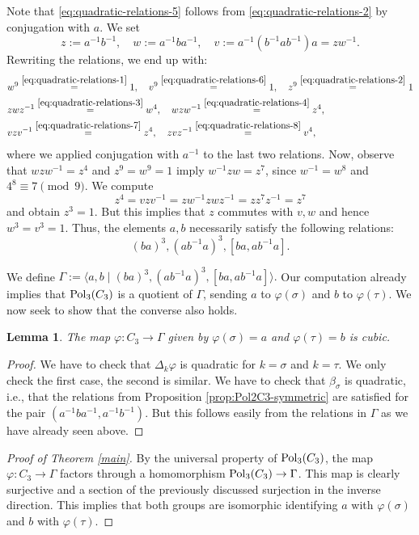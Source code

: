\documentclass[11pt, a4paper]{amsproc}
\newtheorem{lemma}[lem]{Lemma}
\theoremstyle{remark}
\theoremstyle{plain}
\begin{document}
Note that \eqref{eq:quadratic-relations-5} follows from \eqref{eq:quadratic-relations-2} by conjugation with $a$. We set
\[
z := a^{-1}b^{-1},\quad w := a^{-1}ba^{-1},\quad v := a^{-1}(b^{-1}ab^{-1})a = z w^{-1}.
\]
Rewriting the relations, we end up with:
\begin{align*}
&w^9\stackrel{\eqref{eq:quadratic-relations-1}}{=}1, \quad v^9\stackrel{\eqref{eq:quadratic-relations-6}}{=}1, \quad z^9\stackrel{\eqref{eq:quadratic-relations-2}}{=}1\\
 &z w z^{-1}\stackrel{\eqref{eq:quadratic-relations-3}}{=}w^4,\quad w z w^{-1}\stackrel{\eqref{eq:quadratic-relations-4}}{=}z^4,\\
&vz v^{-1}\stackrel{\eqref{eq:quadratic-relations-7}}{=}z^4, \quad  z v z^{-1}\stackrel{\eqref{eq:quadratic-relations-8}}{=} v^4,
\end{align*}
where we applied conjugation with $a^{-1}$ to the last two relations. Now, observe that $wzw^{-1}=z^4$ and $z^9=w^9=1$ imply $w^{-1}z w = z^7$, since $w^{-1}=w^8$ and $4^8 \equiv 7 \pmod{9}$.
We compute
$$z^4=vzv^{-1} = zw^{-1}zwz^{-1} = z z^7 z^{-1} = z^7$$
and obtain $z^3=1$. But this implies that $z$ commutes with $v,w$ and hence $w^3=v^3=1$. Thus, the elements $a,b$ necessarily satisfy the following relations:
$$(ba)^3, (ab^{-1}a)^3, [ba,ab^{-1}a].$$

We define $\Gamma:= \langle a,b\mid (ba)^3, (ab^{-1}a)^3, [ba,ab^{-1}a]\rangle.$ Our computation already implies that ${\rm Pol}_3(C_3)$ is a quotient of $\Gamma$, sending $a$ to $\varphi(\sigma)$ and $b$ to $\varphi(\tau)$. We now seek to show that the converse also holds.

\begin{lemma} The map $\varphi:C_3\to \Gamma$ given by $\varphi(\sigma)=a$ and $\varphi(\tau)=b$ is cubic. \end{lemma}
\begin{proof}
We have to check that $\Delta_k\varphi$ is quadratic for $k=\sigma$ and $k=\tau$. We only check the first case, the second is similar. We have to check that $\beta_\sigma$ is quadratic, i.e., that the relations from Proposition \ref{prop:Pol2C3-symmetric} are satisfied for the pair $(a^{-1}ba^{-1},a^{-1}b^{-1})$. But this follows easily from the relations in $\Gamma$ as we have already seen above.
\end{proof}

\begin{proof}[Proof of Theorem \ref{main}] By the universal property of ${\rm Pol}_3(C_3)$, the map $\varphi \colon C_3 \to \Gamma$ factors through a homomorphism ${\rm Pol}_3(C_3) \to \Gamma$. This map is clearly surjective and a section of the previously discussed surjection in the inverse direction. This implies that both groups are isomorphic identifying $a$ with $\varphi(\sigma)$ and $b$ with $\varphi(\tau)$.
\end{proof}
\end{document}
